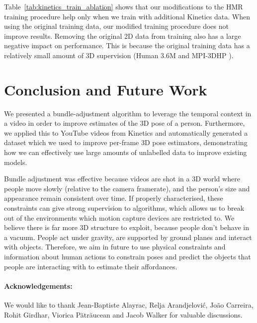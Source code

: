 \documentclass[10pt,twocolumn,letterpaper]{article}
\begin{document}
Table~\ref{tab:kinetics_train_ablation} shows that our modifications to the HMR training procedure help only when we train with additional Kinetics data.
When using the original training data, our modified training procedure does not improve results.
Removing the original 2D data from training also has a large negative impact on performance.
This is because the original training data has a relatively small amount of 3D supervision (Human 3.6M \cite{ionescu_pami_2014} and MPI-3DHP \cite{mehta_3dv_2017}).




 
\section{Conclusion and Future Work}
We presented a bundle-adjustment algorithm to leverage the temporal context in a video in order to improve estimates of the 3D pose of a person.
Furthermore, we applied this to YouTube videos from Kinetics and automatically generated a dataset which we used to improve per-frame 3D pose estimators, demonstrating how we can effectively use large amounts of unlabelled data to improve existing models.

Bundle adjustment was effective because videos are shot in a 3D world where people move slowly (relative to the camera framerate), and the person's size and appearance remain consistent over time.  
If properly characterised, these constraints can give strong supervision to algorithms, which allows us to break out of the environments which motion capture devices are restricted to.
We believe there is far more 3D structure to exploit, because people don't behave in a vacuum.
People act under gravity, are supported by ground planes and interact with objects.
Therefore, we aim in future to use physical constraints and information about human actions to constrain poses and predict the objects that people are interacting with to estimate their affordances.

\paragraph{Acknowledgements:}
We would like to thank Jean-Baptiste Alayrac, Relja Arandjelovi\'c, Jo\~ao Carreira, Rohit Girdhar, Viorica P{\u a}tr{\u a}ucean and Jacob Walker for valuable discussions. 
{\small


}

\clearpage
\appendix
\end{document}
